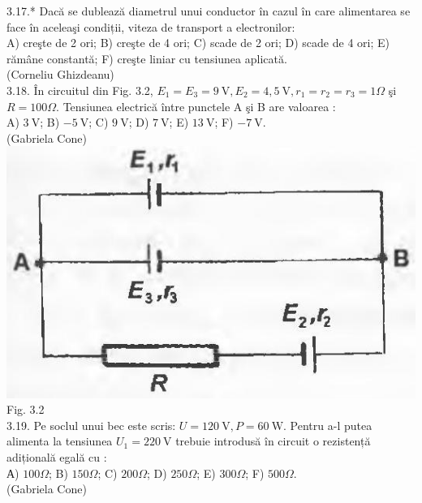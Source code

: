 \documentclass[10pt]{article}
\begin{document}
3.17.* Dacă se dublează diametrul unui conductor în cazul în care alimentarea se face în aceleaşi condiții, viteza de transport a electronilor:\\ A) creşte de 2 ori; B) creşte de 4 ori; C) scade de 2 ori; D) scade de 4 ori; E) rămâne constantă; F) creşte liniar cu tensiunea aplicată.\\ (Corneliu Ghizdeanu)\\

3.18. În circuitul din Fig. 3.2, $E_{1}=E_{3}=9 \mathrm{~V}, E_{2}=4,5 \mathrm{~V}, r_{1}=r_{2}=r_{3}=1 \Omega$ şi $R=100 \Omega$. Tensiunea electrică între punctele A şi B are valoarea :\\ A) $3 \mathrm{~V}$; B) $-5 \mathrm{~V}$; C) $9 \mathrm{~V}$; D) $7 \mathrm{~V}$; E) $13 \mathrm{~V}$; F) $-7 \mathrm{~V}$.\\ (Gabriela Cone)\\ \includegraphics[max width=\textwidth, center]{2025_07_01_5b3ff9fa0d508c8e9f17g-147(1)} Fig. 3.2\\

3.19. Pe soclul unui bec este scris: $U=120 \mathrm{~V}, P=60 \mathrm{~W}$. Pentru a-l putea alimenta la tensiunea $U_{1}=220 \mathrm{~V}$ trebuie introdusă în circuit o rezistență adițională egală cu :\\ А) $100 \Omega$; B) $150 \Omega$; C) $200 \Omega$; D) $250 \Omega$; E) $300 \Omega$; F) $500 \Omega$.\\ (Gabriela Cone)\\
\end{document}

